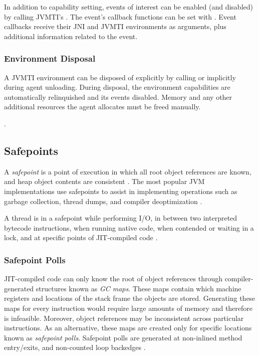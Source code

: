 In addition to capability setting, events of interest can be enabled (and disabled) by calling JVMTI's . The event's callback functions can be set with . Event callbacks receive their JNI and JVMTI environments as arguments, plus additional information related to the event.

\subsubsection*{Environment Disposal}

A JVMTI environment can be disposed of explicitly by calling  or implicitly during agent unloading. During disposal, the environment capabilities are automatically relinquished and its events disabled. Memory and any other additional resources the agent allocates must be freed manually.

.

\subsection{Safepoints}

A \emph{safepoint} is a point of execution in which all root object references are known, and heap object contents are consistent \cite{hotspotglossary}. The most popular JVM implementations use safepoints to assist in implementing operations such as garbage collection, thread dumps, and compiler deoptimization \cite{lin2015yieldpoint}.

A thread is in a safepoint while performing I/O, in between two interpreted bytecode instructions, when running native code, when contended or waiting in a lock, and at specific points of JIT-compiled code \cite{wakart2015safepoints}.

\subsubsection*{Safepoint Polls}

JIT-compiled code can only know the root of object references through compiler-generated structures known as \emph{GC maps}. These maps contain which machine registers and locations of the stack frame the objects are stored. Generating these maps for every instruction would require large amounts of memory and therefore is infeasible. Moreover, object references may be inconsistent across particular instructions. As an alternative, these maps are created only for specific locations known as \emph{safepoint polls}. Safepoint polls are generated at non-inlined method entry/exits, and non-counted loop backedges \cite{hohenseehotspot}.

